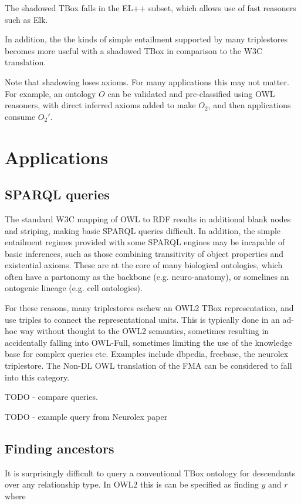 \documentclass{my}
\begin{document}
The shadowed TBox falls in the EL++ subset, which allows use of fast
reasoners such as Elk.

In addition, the the kinds of simple entailment supported by many
triplestores becomes more useful with a shadowed TBox in comparison to
the W3C translation.

Note that shadowing loses axioms. For many applications this may not
matter. For example, an ontology $O$ can be validated and
pre-classified using OWL reasoners, with direct inferred axioms added
to make $O_2$, and then applications consume $O_2'$.

\section{Applications}

\subsection{SPARQL queries}

The standard W3C mapping of OWL to RDF results in additional blank
nodes and striping, making basic SPARQL queries difficult. In
addition, the simple entailment regimes provided with some SPARQL
engines may be incapable of basic inferences, such as those combining
transitivity of object properties and existential axioms. These are at
the core of many biological ontologies, which often have a partonomy
as the backbone (e.g. neuro-anatomy), or somelines an ontogenic
lineage (e.g. cell ontologies).

For these reasons, many triplestores eschew an OWL2 TBox
representation, and use triples to connect the representational
units. This is typically done in an ad-hoc way without thought to the
OWL2 semantics, sometimes resulting in accidentally falling into
OWL-Full, sometimes limiting the use of the knowledge base for complex
queries etc. Examples include dbpedia, freebase, the neurolex
triplestore. The Non-DL OWL translation of the FMA can be considered
to fall into this category.

TODO - compare queries.

TODO - example query from Neurolex paper

\subsection{Finding ancestors}

It is surprisingly difficult to query a conventional TBox ontology for
descendants over any relationship type. In OWL2 this is can be
specified as finding $y$ and $r$ where
\end{document}

